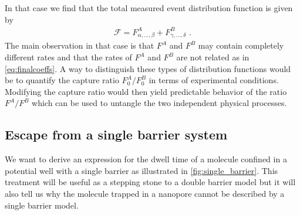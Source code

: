 In that case we find that the total measured event distribution function is given by
%
\begin{align}\label{eq:two_population_distribution}
    \mathcal{F} = F^A_{\alpha,\ldots,\beta} + F^B_{\gamma,\ldots,\delta}
    \text{ .}
\end{align}
%
The main observation in that case is that $F^A$ and $F^B$ may contain completely different rates and that the
rates of $F^A$ and $F^B$ are not related as in \cref{eq:finalcoeffs}. A way to distinguish these types of
distribution functions would be to quantify the capture ratio $F^A_0/F^B_0$ in terms of experimental
conditions. Modifying the capture ratio would then yield predictable behavior of the ratio $F^A/F^B$ which can
be used to untangle the two independent physical processes.


\subsection{Escape from a single barrier system}
%
\label{sec:trapping_appendix:single_barrier_system}
%

We want to derive an expression for the dwell time of a molecule confined in a potential well with a single
barrier as illustrated in \cref{fig:single_barrier}. This treatment will be useful as a stepping stone to a
double barrier model but it will also tell us why the molecule trapped in a nanopore cannot be described by a
single barrier model.

